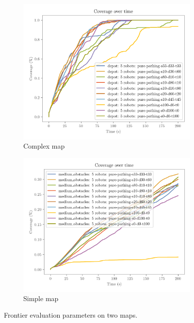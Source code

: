 \begin{figure}[H]
    \centering
    \begin{subfigure}[b]{0.45\textwidth}
        \centering
        \includegraphics[width=\textwidth]{figures/frontier_eval_params_depot.png}
        \caption{Complex map}
    \end{subfigure}
    \begin{subfigure}[b]{0.45\textwidth}
        \centering
        \includegraphics[width=\textwidth]{figures/frontier_eval_params_medium_obstacles.png}
        \caption{Simple map}
    \end{subfigure}
    \caption{Frontier evaluation parameters on two maps.}
    \label{fig:frontier-eval-params}
\end{figure}

